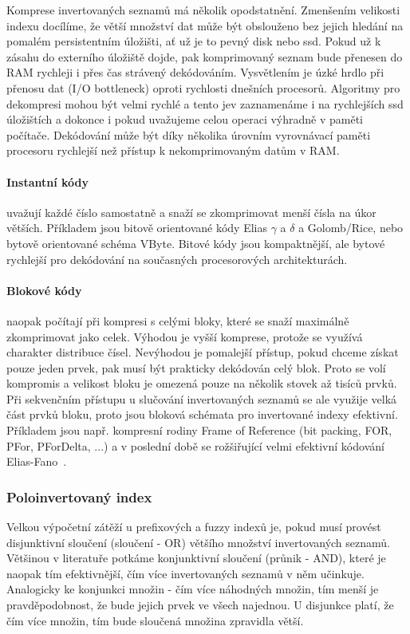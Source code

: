 \documentclass[11pt,letterpaper,oneside,openright]{book}
\begin{document}
Komprese invertovaných seznamů má několik opodstatnění. Zmenšením velikosti
indexu docílíme, že větší množství dat může být obslouženo bez jejich hledání
na pomalém persistentním úložišti, ať už je to pevný disk nebo ssd. Pokud už k
zásahu do externího úložiště dojde, pak komprimovaný seznam bude přenesen do
RAM rychleji i přes čas strávený dekódováním. Vysvětlením je úzké hrdlo při
přenosu dat (I/O bottleneck) oproti rychlosti dnešních procesorů. Algoritmy pro
dekompresi mohou být velmi rychlé a tento jev zaznamenáme i na rychlejších ssd
úložištích a dokonce i pokud uvažujeme celou operaci výhradně v paměti
počítače. Dekódování může být díky několika úrovním vyrovnávací paměti
procesoru rychlejší než přístup k nekomprimovaným datům v RAM. 

\paragraph{Instantní kódy} uvažují každé číslo samostatně a snaží se
zkomprimovat menší čísla na úkor větších. Příkladem jsou bitově orientované
kódy Elias $\gamma$ a $\delta$ a Golomb/Rice, nebo bytově orientované schéma
VByte. Bitové kódy jsou kompaktnější, ale bytové rychlejší pro dekódování na
současných procesorových architekturách.

\paragraph{Blokové kódy} naopak počítají při kompresi s celými bloky, které se
snaží maximálně zkomprimovat jako celek. Výhodou je vyšší komprese, protože se
využívá charakter distribuce čísel. Nevýhodou je pomalejší přístup, pokud
chceme získat pouze jeden prvek, pak musí být prakticky dekódován celý blok.
Proto se volí kompromis a velikost bloku je omezená pouze na několik stovek až
tisíců prvků. Při sekvenčním přístupu u slučování invertovaných seznamů se ale
využije velká část prvků bloku, proto jsou bloková schémata pro invertované
indexy efektivní. Příkladem jsou např. kompresní rodiny Frame of Reference (bit
packing, FOR, PFor, PForDelta, ...) a v poslední době se rožšiřující velmi
efektivní kódování Elias-Fano~\cite{DBLP:journals/corr/abs-1206-4300}.

\subsubsection{Poloinvertovaný index}
Velkou výpočetní zátěží u prefixových a fuzzy indexů je, pokud musí provést
disjunktivní sloučení (sloučení - OR) většího množství invertovaných seznamů.
Většinou v literatuře potkáme konjunktivní sloučení (průnik - AND), které je
naopak tím efektivnější, čím více invertovaných seznamů v něm učinkuje.
Analogicky ke konjunkci množin - čím více náhodných množin, tím menší je
pravděpodobnost, že bude jejich prvek ve všech najednou. U disjunkce platí, že
čím více množin, tím bude sloučená množina zpravidla větší.
\end{document}
